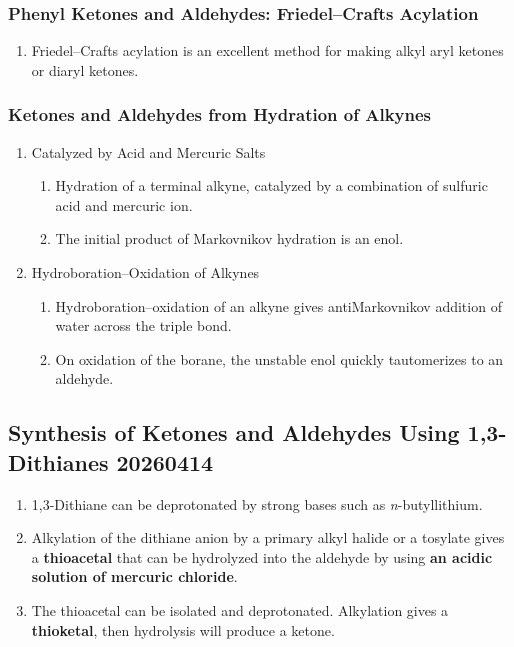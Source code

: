 \subsubsection{Phenyl Ketones and Aldehydes: Friedel–Crafts Acylation}

\begin{enumerate}
    \item Friedel–Crafts acylation is an excellent method for making alkyl aryl ketones or diaryl ketones.
\end{enumerate}

\subsubsection{Ketones and Aldehydes from Hydration of Alkynes}

\begin{enumerate}
    \item Catalyzed by Acid and Mercuric Salts
    \begin{enumerate}
        \item Hydration of a terminal alkyne, catalyzed by a combination of sulfuric acid and mercuric ion.
        \item The initial product of Markovnikov hydration is an enol.
    \end{enumerate}
    \item Hydroboration–Oxidation of Alkynes
    \begin{enumerate}
        \item Hydroboration–oxidation of an alkyne gives antiMarkovnikov addition of water across the triple bond.
        \item On oxidation of the borane, the unstable enol quickly tautomerizes to an aldehyde.
    \end{enumerate}
\end{enumerate}

\subsection{Synthesis of Ketones and Aldehydes Using 1,3-Dithianes 20260414}

\begin{enumerate}
    \item 1,3-Dithiane can be deprotonated by strong bases such as \textit{n}-butyllithium.
    \item Alkylation of the dithiane anion by a primary alkyl halide or a tosylate gives a \textbf{thioacetal} that can be hydrolyzed into the aldehyde by using \textbf{an acidic solution of mercuric chloride}. %
    \item The thioacetal can be isolated and deprotonated. Alkylation gives a \textbf{thioketal}, then hydrolysis will produce a ketone.
\end{enumerate}


